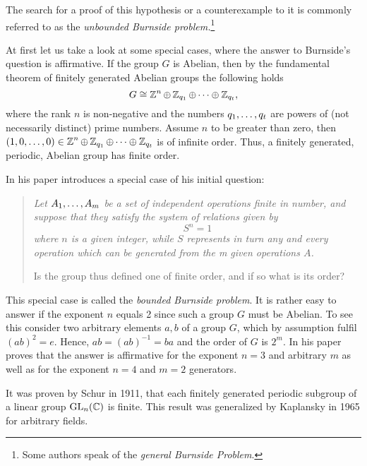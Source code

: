 The search for a proof of this hypothesis or a counterexample to it is commonly referred to as the \emph{unbounded Burnside problem.}\footnote{Some authors speak of the \emph{general Burnside Problem}.}

At first let us take a look at some special cases, where the answer to Burnside's question is affirmative. If the group $G$ is Abelian, then by the fundamental theorem of finitely generated Abelian groups the following holds
\begin{equation*}
G\cong\Z^n \oplus \Z_{q_1} \oplus \cdots \oplus \Z_{q_t},
\end{equation*}
where the rank $n$ is non-negative and the numbers $\seq[t]{q}$ are powers of (not necessarily distinct) prime numbers. Assume $n$ to be greater than zero, then $(1,0,\ldots,0)\in\Z^n \oplus \Z_{q_1} \oplus \cdots \oplus \Z_{q_t}$ is of infinite order. Thus, a finitely generated, periodic, Abelian group has finite order.

In his paper \textcite{burnside1902} introduces a special case of his initial question:
\begin{quotation}
\itshape%
Let $\seq[m]{A}$ be a set of independent operations finite in number, and suppose that they satisfy the system of relations given by
\begin{equation*}
S^n=1
\end{equation*}
where $n$ is a given integer, while $S$ represents in turn any and every operation which can be generated from the m given operations $A$.

Is the group thus defined one of finite order, and if so what is its order?
\end{quotation}
This special case is called the \emph{bounded Burnside problem}. It is rather easy to answer if the exponent $n$ equals 2 since such a group $G$ must be Abelian. To see this consider two arbitrary elements $a,b$ of a group $G$, which by assumption fulfil $(ab)^2=e$. Hence, $ab=(ab)^{-1}=ba$ and the order of $G$ is $2^m$. In his paper \textcite{burnside1902} proves that the answer is affirmative for the exponent $n=3$ and arbitrary $m$ as well as for the exponent $n=4$ and $m=2$ generators.

It was proven by Schur in 1911, that each finitely generated periodic subgroup of a linear group $\mathrm{GL}_n(\C)$ is finite. This result was generalized by Kaplansky in 1965 for arbitrary fields.

